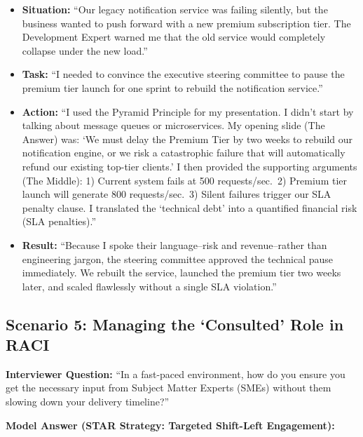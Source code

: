 \documentclass[
  11pt,
  openany,
  oneside]{book}
\providecommand{\tightlist}{%
  \setlength{\itemsep}{0pt}\setlength{\parskip}{0pt}}
\begin{document}
\begin{itemize}
\tightlist
\item
  \textbf{Situation:} ``Our legacy notification service was failing
  silently, but the business wanted to push forward with a new premium
  subscription tier. The Development Expert warned me that the old
  service would completely collapse under the new load.''
\item
  \textbf{Task:} ``I needed to convince the executive steering committee
  to pause the premium tier launch for one sprint to rebuild the
  notification service.''
\item
  \textbf{Action:} ``I used the Pyramid Principle for my presentation. I
  didn't start by talking about message queues or microservices. My
  opening slide (The Answer) was: `We must delay the Premium Tier by two
  weeks to rebuild our notification engine, or we risk a catastrophic
  failure that will automatically refund our existing top-tier clients.'
  I then provided the supporting arguments (The Middle): 1) Current
  system fails at 500 requests/sec.~2) Premium tier launch will generate
  800 requests/sec.~3) Silent failures trigger our SLA penalty clause. I
  translated the `technical debt' into a quantified financial risk (SLA
  penalties).''
\item
  \textbf{Result:} ``Because I spoke their language--risk and
  revenue--rather than engineering jargon, the steering committee
  approved the technical pause immediately. We rebuilt the service,
  launched the premium tier two weeks later, and scaled flawlessly
  without a single SLA violation.''
\end{itemize}

\subsection{Scenario 5: Managing the `Consulted' Role in
RACI}\label{scenario-5-managing-the-consulted-role-in-raci}

\textbf{Interviewer Question:} ``In a fast-paced environment, how do you
ensure you get the necessary input from Subject Matter Experts (SMEs)
without them slowing down your delivery timeline?''

\textbf{Model Answer (STAR Strategy: Targeted Shift-Left Engagement):}
\end{document}
